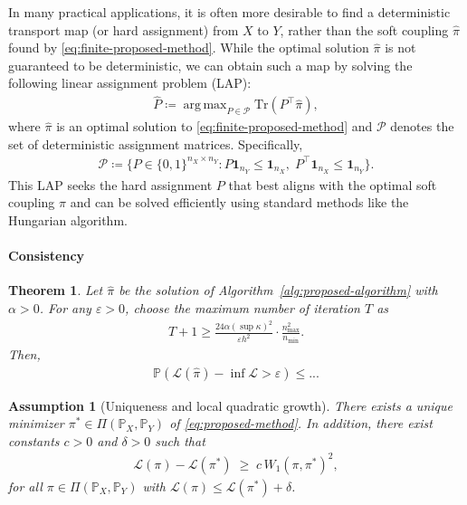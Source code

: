\documentclass{article}
\newtheorem{theorem}{Theorem}
\newtheorem{assumption}{Assumption}
\DeclareMathOperator*{\argmax}{arg\,max}
\begin{document}
In many practical applications, it is often more desirable to find a deterministic transport map (or hard assignment) from $X$ to $Y$, rather than the soft coupling $\hat{\pi}$ found by \eqref{eq:finite-proposed-method}. While the optimal solution $\hat{\pi}$ is not guaranteed to be deterministic, we can obtain such a map by solving the following linear assignment problem (LAP):
\begin{align}
	\label{eq:finite-projection-method}
	\hat{P} \coloneqq \argmax_{P \in \mathcal{P}} \mathrm{Tr}(P^\top\hat{\pi}) ,
\end{align}
where $\hat{\pi}$ is an optimal solution to \eqref{eq:finite-proposed-method} and $\mathcal{P}$ denotes the set of deterministic assignment matrices. Specifically, 
\begin{align}
	\label{eq:assign-matrix-space}
	\mathcal{P} \coloneqq \{P \in \{0,1\}^{n_X \times n_Y}: P\mathbf{1}_{n_Y} \leq \mathbf{1}_{n_X}, \; P^\top\mathbf{1}_{n_X} \leq \mathbf{1}_{n_Y}\} .
\end{align}
This LAP seeks the hard assignment $P$ that best aligns with the optimal soft coupling $\hat{\pi}$ and can be solved efficiently using standard methods like the Hungarian algorithm.



\paragraph{Consistency}
\begin{theorem}
	\label{thm:consistency}
	Let $\hat{\pi}$ be the solution of Algorithm~\ref{alg:proposed-algorithm} with $\alpha > 0$. For any $\varepsilon > 0$, choose the maximum number of iteration $T$ as
	\begin{align*}
		T + 1 \geq \frac{24\alpha(\sup\kappa)^2}{\varepsilon h^2} \cdot \frac{n_{\max}^2}{n_{\min}} .
	\end{align*}
	Then,
	\begin{align*}
		\mathbb{P}\left(\mathcal{L}(\hat{\pi}) - \inf \mathcal{L} > \varepsilon \right) \leq ...
	\end{align*}
\end{theorem}

\begin{assumption}[Uniqueness and local quadratic growth]
	\label{ass:uniqueness-local-quadratic-growth}
	There exists a unique minimizer $\pi^\ast \in \Pi(\mathbb{P}_X,\mathbb{P}_Y)$ of \eqref{eq:proposed-method}. In addition, there exist constants $c>0$ and $\delta>0$ such that
	\begin{align*}
		\mathcal{L}(\pi)-\mathcal{L}(\pi^\ast) \;\geq\; c\, W_1(\pi,\pi^\ast)^2 ,
	\end{align*}
	for all $\pi\in\Pi(\mathbb{P}_X,\mathbb{P}_Y)$ with $\mathcal{L}(\pi)\le \mathcal{L}(\pi^\ast)+\delta$.
\end{assumption}
\end{document}
